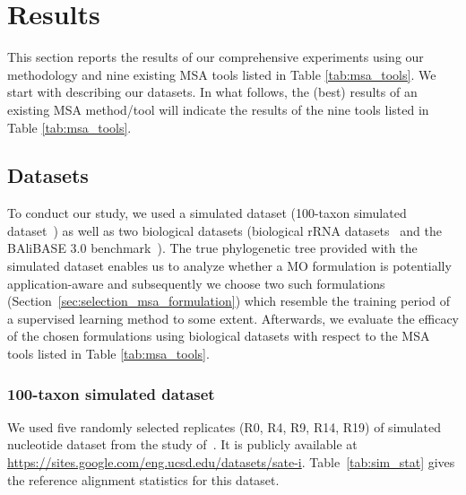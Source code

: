\section{Results}
\label{sec:results}
This section reports the results of our comprehensive experiments using our methodology and nine existing MSA tools listed in Table \ref{tab:msa_tools}. We start with describing our datasets. In what follows, the (best) results  of an existing MSA method/tool will indicate the results of the nine tools listed in Table \ref{tab:msa_tools}.


\subsection{Datasets}
To conduct our study, we used a simulated dataset (100-taxon simulated dataset~\citep{liu2009rapid}) as well as two biological datasets (biological rRNA datasets~\citep{liu2009rapid} and the BAliBASE 3.0 benchmark~\citep{thompson2005balibase}). The true phylogenetic tree provided with the simulated dataset enables us to analyze whether a MO formulation is potentially application-aware and subsequently we choose two such formulations (Section~\ref{sec:selection_msa_formulation}) which resemble the training period of a supervised learning method to some extent. Afterwards, we evaluate the efficacy of the chosen formulations using biological datasets with respect to the MSA tools listed in Table \ref{tab:msa_tools}.  



\subsubsection{100-taxon simulated dataset}
We used five randomly selected replicates (R0, R4, R9, R14, R19) of simulated nucleotide dataset from the study of~\citealp{liu2009rapid}. It is publicly available at \url{https://sites.google.com/eng.ucsd.edu/datasets/sate-i}. Table~\ref{tab:sim_stat} gives the reference alignment statistics for this dataset.

